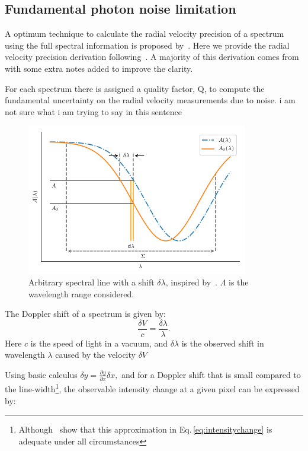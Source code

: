 \subsection{Fundamental photon noise limitation}

A optimum technique to calculate the radial velocity precision of a spectrum using the full spectral information is proposed by~\citet{Connes1985}. Here we provide the radial velocity precision derivation following~\citet{Connes1985, bouchy_fundamental_2001, figueira_radial_2016}. A majority of this derivation comes from~\citet{bouchy_fundamental_2001} with some extra notes added to improve the clarity.

For each spectrum there is assigned a quality factor, Q, to compute the fundamental uncertainty on the radial velocity measurements due to noise. {\red{} i am not sure what i am trying to say in this sentence}

\begin{figure}
    \centering
    \includegraphics[width=0.7\linewidth]{figures/precision_derivation.png}
    \caption{Arbitrary spectral line with a shift $\delta \lambda$, inspired by~\citet{Connes1985}.  \(\Lambda\) is the wavelength range considered.}
    \label{fig:precisionderivation}
\end{figure}

The Doppler shift of a spectrum is given by:
\begin{equation}
\frac{\delta V}{c} = \frac{\delta \lambda}{\lambda}.
\label{eq:dopplershift}
\end{equation}
Here $c$ is the speed of light in a vacuum, and $\delta \lambda$ is the observed shift in wavelength $\lambda$ caused by the velocity $\delta V$

Using basic calculus \(\delta y = \frac{\partial y}{\partial x} \delta x,  \nonumber\) and for a Doppler shift that is small compared to the line-width\footnote{Although~\citet{Connes1985} show that this approximation in Eq.\,\ref{eq:intensitychange} is adequate under all circumstances}, the observable intensity change at a given pixel can be expressed by:

